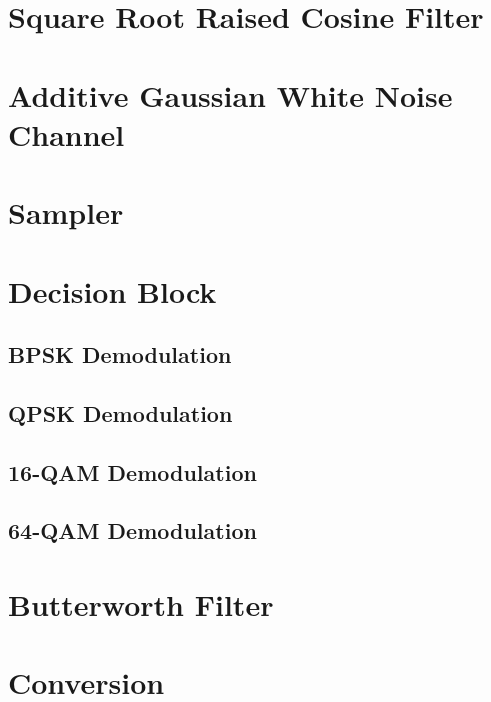 \documentclass[]{article}
\begin{document}
\section{Square Root Raised Cosine Filter}
\label{app:sqrt_raised_cosine}


\section{Additive Gaussian White Noise Channel}
\label{app:awgn_channel}


\section{Sampler}
\label{app:sampler}


\section{Decision Block}
\label{app:dblocks}
\subsection{BPSK Demodulation}
\label{app:bpsk_demod}


\subsection{QPSK Demodulation}
\label{app:qpsk_demod}


\subsection{16-QAM Demodulation}
\label{app:16qam_demod}


\subsection{64-QAM Demodulation}
\label{app:64qam_demod}


\section{Butterworth Filter}
\label{app:butterworth}


\section{Conversion}
\label{app:convert}
\end{document}

